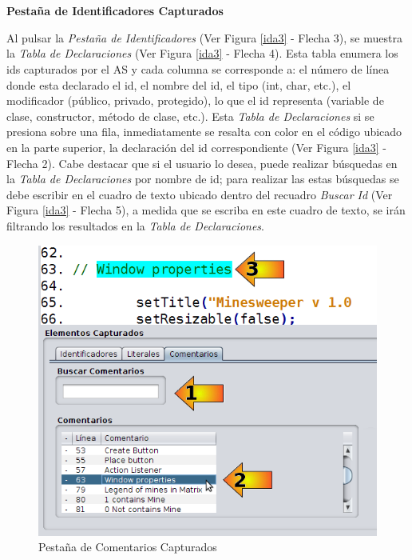 \noindent \textbf{\\\\Pestaña de Identificadores Capturados\\} 

Al pulsar la \textit{Pestaña de Identificadores} (Ver Figura \ref{ida3} - Flecha 3), se muestra la \textit{Tabla de Declaraciones} (Ver Figura \ref{ida3} - Flecha 4). Esta tabla enumera los ids capturados por el AS y cada columna se corresponde a: el número de línea donde esta declarado el id, el nombre del id, el tipo (int, char, etc.), el modificador (público, privado, protegido), lo que el id representa (variable de clase, constructor, método de clase, etc.).
Esta \textit{Tabla de Declaraciones} si se presiona sobre una fila, inmediatamente se resalta con color en el código ubicado en la parte superior, la declaración del id correspondiente (Ver Figura \ref{ida3} - Flecha 2). 
Cabe destacar que si el usuario lo desea, puede realizar búsquedas en la \textit{Tabla de Declaraciones} por nombre de id; para realizar las estas búsquedas se debe escribir en el cuadro de texto ubicado dentro del recuadro \textit{Buscar Id} (Ver Figura \ref{ida3} - Flecha 5), a medida que se escriba en este cuadro de texto, se irán filtrando los resultados en la \textit{Tabla de Declaraciones}.

\begin{figure}[t] %
\centerline{%
\includegraphics[scale= 0.55]{./cap4/ida_05.png}
}
\caption{Pestaña de Comentarios Capturados}
\label{ida5}
\end{figure}

